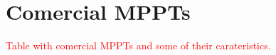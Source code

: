 \section{Comercial MPPTs}

\textcolor{red}{Table with comercial MPPTs and some of their carateristics.}





